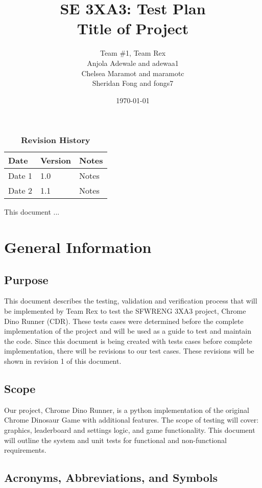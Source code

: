 \documentclass[12pt, titlepage]{article}
\title{SE 3XA3: Test Plan\\Title of Project}
\author{Team \#1, Team Rex
	\\ Anjola Adewale and adewaa1
	\\ Chelsea Maramot and maramotc
	\\ Sheridan Fong and fongs7
}
\date{\today}
\begin{document}
\maketitle

\tableofcontents
\listoftables
\listoffigures

\begin{table}[bp]
\caption{\bf Revision History}
\begin{tabularx}{\textwidth}{p{3cm}p{2cm}X}
\toprule {\bf Date} & {\bf Version} & {\bf Notes}\\
\midrule
Date 1 & 1.0 & Notes\\
Date 2 & 1.1 & Notes\\
\bottomrule
\end{tabularx}
\end{table}

\newpage


This document ...

\section{General Information}

\subsection{Purpose}
This document describes the testing, validation and verification process that will be implemented by Team Rex to test the SFWRENG 3XA3 project, Chrome Dino Runner (CDR). These tests cases were determined before the complete implementation of the project and will be used as a guide to test and maintain the code. Since this document is being created with tests cases before complete implementation, there will be revisions to our test cases. These revisions will be shown in revision 1 of this document. 

\subsection{Scope}
Our project, Chrome Dino Runner, is a python implementation of the original Chrome Dinosaur Game with additional features. The scope of testing will cover: graphics, leaderboard and settings logic, and game functionality. This document will outline the system and unit tests for functional and non-functional requirements. 


\subsection{Acronyms, Abbreviations, and Symbols}
	
\end{document}
